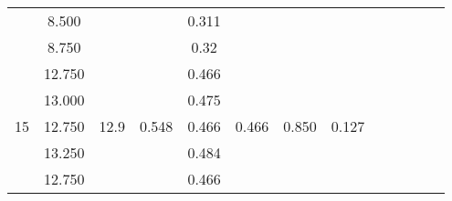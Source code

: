 \documentclass[a4paper,12pt]{article}
\begin{document}
\begin{table}[htp]
\begin{tabular}{|c|c|c|c|c|c|c|c|c|c|c|c|c|}
                       & 8.500                   &                                       &                        & 0.311 &                        &                        &                        &                                                            &                                                            &                        &                         &                        \\ \cline{2-2} \cline{5-5}
                       & 8.750                   &                                       &                        & 0.32  &                        &                        &                        &                                                            &                                                            &                        &                         &                        \\ \cline{1-8}
\multirow{5}{*}{15}    & 12.750                  & \multirow{5}{*}{12.9}                 & \multirow{5}{*}{0.548} & 0.466 & \multirow{5}{*}{0.466} & \multirow{5}{*}{0.850} & \multirow{5}{*}{0.127} &                                                            &                                                            &                        &                         &                        \\ \cline{2-2} \cline{5-5}
                       & 13.000                  &                                       &                        & 0.475 &                        &                        &                        &                                                            &                                                            &                        &                         &                        \\ \cline{2-2} \cline{5-5}
                       & 12.750                  &                                       &                        & 0.466 &                        &                        &                        &                                                            &                                                            &                        &                         &                        \\ \cline{2-2} \cline{5-5}
                       & 13.250                  &                                       &                        & 0.484 &                        &                        &                        &                                                            &                                                            &                        &                         &                        \\ \cline{2-2} \cline{5-5}
                       & 12.750                  &                                       &                        & 0.466 &                        &                        &                        &                                                            &                                                            &                        &                         &                        \\ \hline
\end{tabular}
\end{table}
\end{document}
